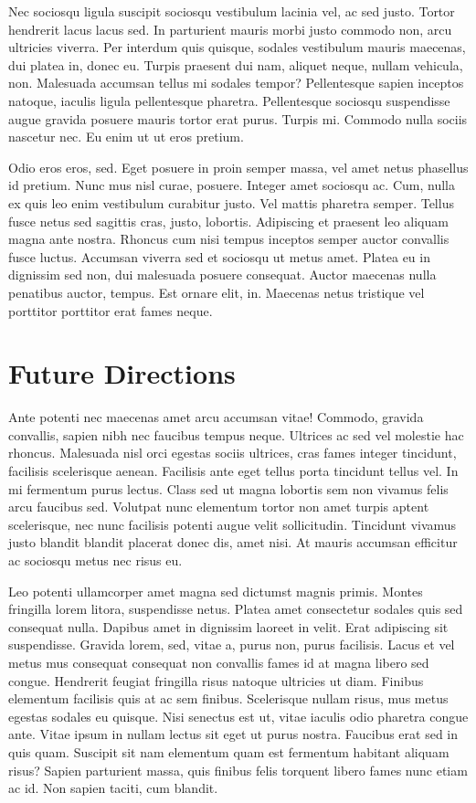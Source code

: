 \documentclass[]{article}
\begin{document}
Nec sociosqu ligula suscipit sociosqu vestibulum lacinia vel, ac sed
justo. Tortor hendrerit lacus lacus sed. In parturient mauris morbi
justo commodo non, arcu ultricies viverra. Per interdum quis quisque,
sodales vestibulum mauris maecenas, dui platea in, donec eu. Turpis
praesent dui nam, aliquet neque, nullam vehicula, non. Malesuada
accumsan tellus mi sodales tempor? Pellentesque sapien inceptos natoque,
iaculis ligula pellentesque pharetra. Pellentesque sociosqu suspendisse
augue gravida posuere mauris tortor erat purus. Turpis mi. Commodo nulla
sociis nascetur nec. Eu enim ut ut eros pretium.

Odio eros eros, sed. Eget posuere in proin semper massa, vel amet netus
phasellus id pretium. Nunc mus nisl curae, posuere. Integer amet
sociosqu ac. Cum, nulla ex quis leo enim vestibulum curabitur justo. Vel
mattis pharetra semper. Tellus fusce netus sed sagittis cras, justo,
lobortis. Adipiscing et praesent leo aliquam magna ante nostra. Rhoncus
cum nisi tempus inceptos semper auctor convallis fusce luctus. Accumsan
viverra sed et sociosqu ut metus amet. Platea eu in dignissim sed non,
dui malesuada posuere consequat. Auctor maecenas nulla penatibus auctor,
tempus. Est ornare elit, in. Maecenas netus tristique vel porttitor
porttitor erat fames neque.

\hypertarget{future-directions}{%
\section{Future Directions}\label{future-directions}}

Ante potenti nec maecenas amet arcu accumsan vitae! Commodo, gravida
convallis, sapien nibh nec faucibus tempus neque. Ultrices ac sed vel
molestie hac rhoncus. Malesuada nisl orci egestas sociis ultrices, cras
fames integer tincidunt, facilisis scelerisque aenean. Facilisis ante
eget tellus porta tincidunt tellus vel. In mi fermentum purus lectus.
Class sed ut magna lobortis sem non vivamus felis arcu faucibus sed.
Volutpat nunc elementum tortor non amet turpis aptent scelerisque, nec
nunc facilisis potenti augue velit sollicitudin. Tincidunt vivamus justo
blandit blandit placerat donec dis, amet nisi. At mauris accumsan
efficitur ac sociosqu metus nec risus eu.

Leo potenti ullamcorper amet magna sed dictumst magnis primis. Montes
fringilla lorem litora, suspendisse netus. Platea amet consectetur
sodales quis sed consequat nulla. Dapibus amet in dignissim laoreet in
velit. Erat adipiscing sit suspendisse. Gravida lorem, sed, vitae a,
purus non, purus facilisis. Lacus et vel metus mus consequat consequat
non convallis fames id at magna libero sed congue. Hendrerit feugiat
fringilla risus natoque ultricies ut diam. Finibus elementum facilisis
quis at ac sem finibus. Scelerisque nullam risus, mus metus egestas
sodales eu quisque. Nisi senectus est ut, vitae iaculis odio pharetra
congue ante. Vitae ipsum in nullam lectus sit eget ut purus nostra.
Faucibus erat sed in quis quam. Suscipit sit nam elementum quam est
fermentum habitant aliquam risus? Sapien parturient massa, quis finibus
felis torquent libero fames nunc etiam ac id. Non sapien taciti, cum
blandit.
\end{document}
